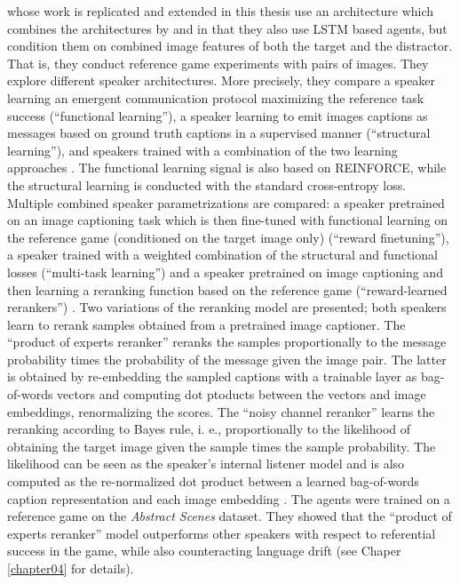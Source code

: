 \cite{lazaridou2020multi} whose work is replicated and extended in this thesis use an architecture which combines the architectures by \cite{lazaridou2016multi} and \cite{havrylov2017emergence} in that they also use LSTM based agents, but condition them on combined image features of both the target and the distractor. That is, they conduct reference game experiments with pairs of images. They explore different speaker architectures. More precisely, they compare a speaker learning an emergent communication protocol maximizing the reference task success (``functional learning''), a speaker learning to emit images captions as messages based on ground truth captions in a supervised manner (``structural learning''), and speakers trained with a combination of the two learning approaches \parencite[][p. 4]{lazaridou2020multi}. The functional learning signal is also based on REINFORCE, while the structural learning is conducted with the standard cross-entropy loss. Multiple combined speaker parametrizations are compared: a speaker pretrained on an image captioning task which is then fine-tuned with functional learning on the reference game (conditioned on the target image only) (``reward finetuning''), a speaker trained with a weighted combination of the structural and functional losses (``multi-task learning'') and a speaker pretrained on image captioning and then learning a reranking function based on the reference game (``reward-learned rerankers'') \parencite[][p. 4--5]{lazaridou2020multi}. Two variations of the reranking model are presented; both speakers learn to rerank samples obtained from a pretrained image captioner. The ``product of experts reranker'' reranks the samples proportionally to the message probability times the probability of the message given the image pair. The latter is obtained by re-embedding the sampled captions with a trainable layer as bag-of-words vectors and computing dot ptoducts between the vectors and image embeddings, renormalizing the scores.  The ``noisy channel reranker'' learns the reranking according to Bayes rule, i. e., proportionally to the likelihood of obtaining the target image given the sample times the sample probability. The likelihood can be seen as the speaker's internal listener model and is also computed as the re-normalized dot product between a learned bag-of-words caption representation and each image embedding \parencite[][p. 5--6]{lazaridou2020multi}. The agents were trained on a reference game on the \textit{Abstract Scenes} dataset.
They showed that the ``product of experts reranker'' model outperforms other speakers with respect to referential success in the game, while also counteracting language drift (see Chaper \ref{chapter04} for details). 


